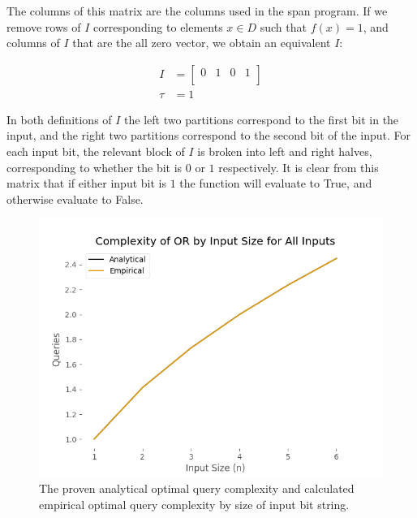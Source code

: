 The columns of this matrix are the columns used in the span program. If we remove rows of $I$ corresponding to elements $ x \in D$ such that $f(x) = 1$, and columns of $I$ that are the all zero vector, we obtain an equivalent $I$:

\begin{align}
I &= \left[\begin{array}{c|c|c|c}
   0 & 1 & 0 & 1 \\
\end{array} \right] \nonumber \\
\tau &= 1 \nonumber
\end{align}

In both definitions of $I$ the left two partitions correspond to the first bit in the
input, and the right two partitions correspond to the second bit of the input. For each
input bit, the relevant block of $I$ is broken into left and right halves, corresponding
to whether the bit is $0$ or $1$ respectively. It is clear from this matrix that if either input bit is $1$ the function will evaluate to True, and otherwise evaluate to False.

\begin{figure}[ht]
\centering
\includegraphics[scale=.5]{figures/or_all_complexity.png}
\caption{The proven analytical optimal query complexity
and calculated empirical optimal query complexity by 
size of input bit string.}
\label{fig:or_all_complexity}
\end{figure}

